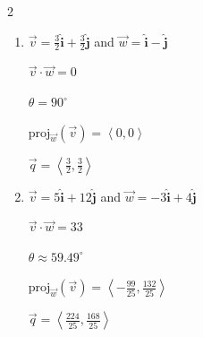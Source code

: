\documentclass{ximera}
\begin{document}
\begin{multicols}{2} \raggedcolumns 
\begin{enumerate}
\setcounter{enumi}{\value{HW}}


\item  $\overrightarrow{v} =\frac{3}{2}  \bm\hat{\text{i}}+ \frac{3}{2}  \bm\hat{\text{j}}$ and $\overrightarrow{w} =  \bm\hat{\text{i}}-  \bm\hat{\text{j}}$

 $\overrightarrow{v} \cdot \overrightarrow{w} = 0$

 $\theta = 90^{\circ}$ 

 $\text{proj}_{\overrightarrow{w}}(\overrightarrow{v}) = \left\langle 0,0 \right\rangle$

 $\overrightarrow{q} = \left\langle \frac{3}{2},\frac{3}{2} \right\rangle$

\vfill

\item $\overrightarrow{v} = 5 \bm\hat{\text{i}}+ 12 \bm\hat{\text{j}}$ and $\overrightarrow{w} = -3 \bm\hat{\text{i}}+ 4 \bm\hat{\text{j}}$

 $\overrightarrow{v} \cdot \overrightarrow{w} = 33$

 $\theta \approx  59.49^{\circ}$ 

 $\text{proj}_{\overrightarrow{w}}(\overrightarrow{v}) = \left\langle -\frac{99}{25}, \frac{132}{25} \right\rangle$

 $\overrightarrow{q} = \left\langle \frac{224}{25},\frac{168}{25} \right\rangle$
 
\setcounter{HW}{\value{enumi}}
\end{enumerate}
\end{multicols}
\end{document}
